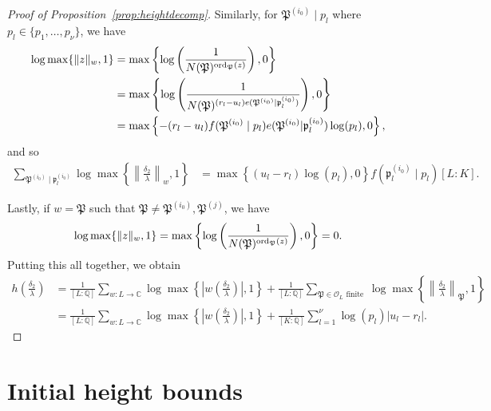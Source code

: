 \begin{proof}[Proof of Proposition~\ref{prop:heightdecomp}]
Similarly, for $\mathfrak{P}^{(i_0)}\mid p_l$ where $p_l \in \{p_1, \dots, p_{\nu}\}$, we have
\begin{align*}
 \log \max \{ \|z\|_{w}, 1\}	
 	& = \max \left\{ \log\left(\frac{1}{N(\mathfrak{P})^{\operatorname{ord}_{\mathfrak{P}}(z)}} \right), 0\right\}\\
	& = \max \left\{ \log\left(\frac{1}{N(\mathfrak{P})^{(r_l - u_l)e(\mathfrak{P}^{(i_0)}|\mathfrak{p}_l^{(i_0)})}} \right), 0\right\}\\
	& = \max \left\{ -(r_l - u_l)f(\mathfrak{P}^{(i_0)}\mid p_l)e(\mathfrak{P}^{(i_0)}|\mathfrak{p}_l^{(i_0)})\log(p_l), 0\right\},
\end{align*}
and so
\begin{align*}
\sum_{\mathfrak{P}^{(i_0)} \mid \mathfrak{p}_l^{(i_0)}} \log \max \left\{ \left\|\frac{\delta_2}{\lambda}\right\|_{w}, 1\right\}
	& = \max \left\{ (u_l - r_l)\log(p_l), 0\right\}f(\mathfrak{p}_l^{(i_0)}\mid p_l)[L:K].
\end{align*}

Lastly, if $w = \mathfrak{P}$ such that $\mathfrak{P} \neq \mathfrak{P}^{(i_0)},  \mathfrak{P}^{(j)}$, we have
\[\log \max \{ \|z\|_{w}, 1\} = \max \left\{ \log\left(\frac{1}{N(\mathfrak{P})^{\operatorname{ord}_{\mathfrak{P}}(z)}} \right), 0\right\}=0.\]
Putting this all together, we obtain
\begin{align*}
h\left(\frac{\delta_2}{\lambda}\right)
	& = \frac{1}{[L:\mathbb{Q}]}\sum_{w :L \to \mathbb{C}} \log \max \left\{ \left|w\left(\frac{\delta_2}{\lambda}\right)\right|, 1\right\} + \frac{1}{[L:\mathbb{Q}]}\sum_{\mathfrak{P} \in \mathcal{O}_L \text{ finite }} \log \max \left\{ \left\|\frac{\delta_2}{\lambda}\right\|_{\mathfrak{P}}, 1\right\}\\
	& = \frac{1}{[L:\mathbb{Q}]}\sum_{w :L \to \mathbb{C}} \log \max \left\{ \left|w\left(\frac{\delta_2}{\lambda}\right)\right|, 1\right\} + \frac{1}{[K:\mathbb{Q}]}\sum_{l = 1}^{\nu} \log(p_l)|u_l - r_l|.
\end{align*}
\end{proof}

\section{Initial height bounds}
\label{sec:InitialHeightBounds}

